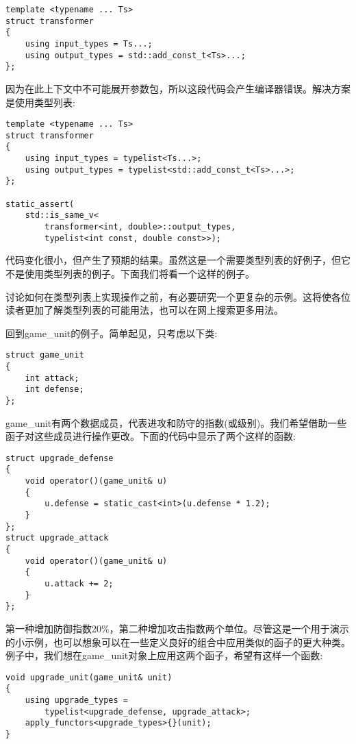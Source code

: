 \begin{lstlisting}[style=styleCXX]
template <typename ... Ts>
struct transformer
{
	using input_types = Ts...;
	using output_types = std::add_const_t<Ts>...;
};
\end{lstlisting}

因为在此上下文中不可能展开参数包，所以这段代码会产生编译器错误。解决方案是使用类型列表:

\begin{lstlisting}[style=styleCXX]
template <typename ... Ts>
struct transformer
{
	using input_types = typelist<Ts...>;
	using output_types = typelist<std::add_const_t<Ts>...>;
};

static_assert(
	std::is_same_v<
		transformer<int, double>::output_types,
		typelist<int const, double const>>);
\end{lstlisting}

代码变化很小，但产生了预期的结果。虽然这是一个需要类型列表的好例子，但它不是使用类型列表的例子。下面我们将看一个这样的例子。


讨论如何在类型列表上实现操作之前，有必要研究一个更复杂的示例。这将使各位读者更加了解类型列表的可能用法，也可以在网上搜索更多用法。

回到game\_unit的例子。简单起见，只考虑以下类:

\begin{lstlisting}[style=styleCXX]
struct game_unit
{
	int attack;
	int defense;
};
\end{lstlisting}

game\_unit有两个数据成员，代表进攻和防守的指数(或级别)。我们希望借助一些函子对这些成员进行操作更改。下面的代码中显示了两个这样的函数:

\begin{lstlisting}[style=styleCXX]
struct upgrade_defense
{
	void operator()(game_unit& u)
	{
		u.defense = static_cast<int>(u.defense * 1.2);
	}
};
struct upgrade_attack
{
	void operator()(game_unit& u)
	{
		u.attack += 2;
	}
};
\end{lstlisting}

第一种增加防御指数20\%，第二种增加攻击指数两个单位。尽管这是一个用于演示的小示例，也可以想象可以在一些定义良好的组合中应用类似的函子的更大种类。例子中，我们想在game\_unit对象上应用这两个函子，希望有这样一个函数:

\begin{lstlisting}[style=styleCXX]
void upgrade_unit(game_unit& unit)
{
	using upgrade_types =
		typelist<upgrade_defense, upgrade_attack>;
	apply_functors<upgrade_types>{}(unit);
}
\end{lstlisting}

